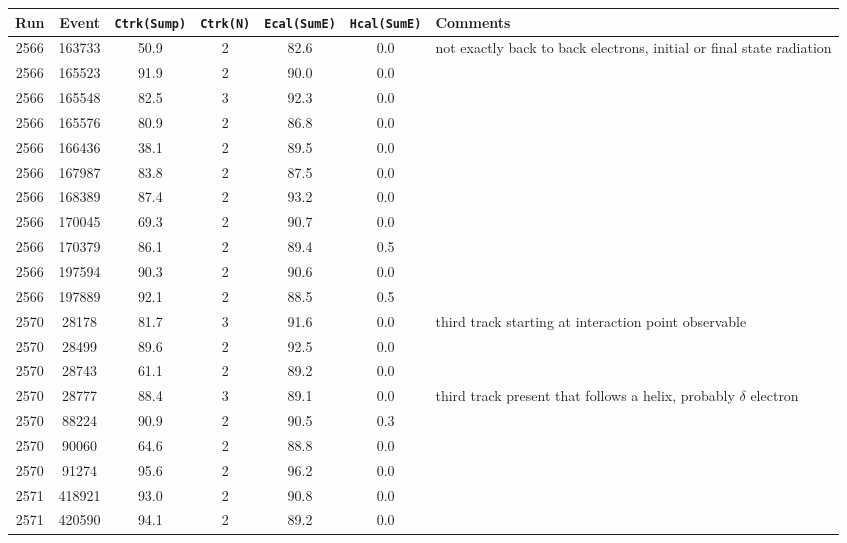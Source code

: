 \begin{tabular}{ccccccl}
	\toprule
	Run & Event & \texttt{Ctrk(Sump)} & \texttt{Ctrk(N)} & \texttt{Ecal(SumE)} & \texttt{Hcal(SumE)} & Comments \\
	\midrule
	2566 & 163733 & 50.9       & 2       & 82.6       & 0.0        &  not exactly back to back electrons, initial or final state radiation\\
	2566 & 165523 & 91.9       & 2       & 90.0       & 0.0        &  \\
	2566 & 165548 & 82.5       & 3       & 92.3       & 0.0        &  \\
	2566 & 165576 & 80.9       & 2       & 86.8       & 0.0        &  \\
	2566 & 166436 & 38.1       & 2       & 89.5       & 0.0        &  \korr{Bremsstrahlung?}\\
	2566 & 167987 & 83.8       & 2       & 87.5       & 0.0        &  \\
	2566 & 168389 & 87.4       & 2       & 93.2       & 0.0        &  \\
	2566 & 170045 & 69.3       & 2       & 90.7       & 0.0        &  \\
	2566 & 170379 & 86.1       & 2       & 89.4       & 0.5        &  \\
	2566 & 197594 & 90.3       & 2       & 90.6       & 0.0        &  \\
	2566 & 197889 & 92.1       & 2       & 88.5       & 0.5        &  \\
	2570 & 28178  & 81.7       & 3       & 91.6       & 0.0        &  third track starting at interaction point observable\\
	2570 & 28499  & 89.6       & 2       & 92.5       & 0.0        &  \\
	2570 & 28743  & 61.1       & 2       & 89.2       & 0.0        &  \korr{Bremsstrahlung?}\\
	2570 & 28777  & 88.4       & 3       & 89.1       & 0.0        &  third track present that follows a helix, probably $\delta$ electron\\
	2570 & 88224  & 90.9       & 2       & 90.5       & 0.3        &  \\
	2570 & 90060  & 64.6       & 2       & 88.8       & 0.0        &  \korr{Bremsstrahlung?}\\
	2570 & 91274  & 95.6       & 2       & 96.2       & 0.0        &  \\
	2571 & 418921 & 93.0       & 2       & 90.8       & 0.0        &  \\
	2571 & 420590 & 94.1       & 2       & 89.2       & 0.0        &  \\
	\bottomrule
\end{tabular}